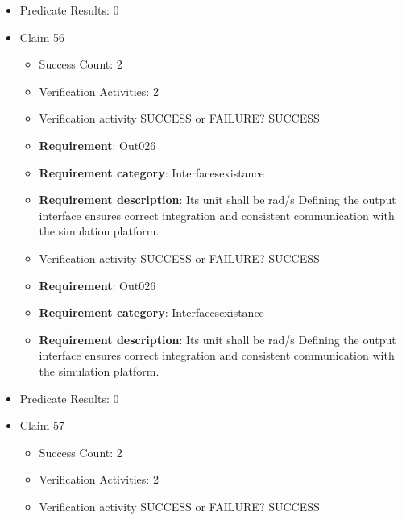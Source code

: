 \documentclass{article}
\begin{document}
\begin{itemize}
\begin{itemize}
					\item Verification activity SUCCESS or FAILURE? SUCCESS
		
						\item \textbf{Requirement}: Out025 
						\item \textbf{Requirement category}: Interfacesexistance 
						\item \textbf{Requirement description}: Its unit shall be rad/s Defining the output interface ensures correct integration and consistent communication with the simulation platform.
					
				\end{itemize}
				
									    
				\item Predicate Results: 0

  				  \item Claim 56
				\begin{itemize}
			    	\item Success Count: 2 
			    	\item Verification Activities: 2
					\item Verification activity SUCCESS or FAILURE? SUCCESS
		
						\item \textbf{Requirement}: Out026 
						\item \textbf{Requirement category}: Interfacesexistance 
						\item \textbf{Requirement description}: Its unit shall be rad/s Defining the output interface ensures correct integration and consistent communication with the simulation platform.
					
					\item Verification activity SUCCESS or FAILURE? SUCCESS
		
						\item \textbf{Requirement}: Out026 
						\item \textbf{Requirement category}: Interfacesexistance 
						\item \textbf{Requirement description}: Its unit shall be rad/s Defining the output interface ensures correct integration and consistent communication with the simulation platform.
					
				\end{itemize}
				
									    
				\item Predicate Results: 0

  				  \item Claim 57
				\begin{itemize}
			    	\item Success Count: 2 
			    	\item Verification Activities: 2
					\item Verification activity SUCCESS or FAILURE? SUCCESS
		

\end{itemize}
\end{itemize}
\end{document}
